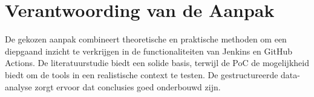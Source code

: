 \section{Verantwoording van de Aanpak}
De gekozen aanpak combineert theoretische en praktische methoden om een diepgaand inzicht te verkrijgen in de functionaliteiten van Jenkins en GitHub Actions. De literatuurstudie biedt een solide basis, terwijl de PoC de mogelijkheid biedt om de tools in een realistische context te testen. De gestructureerde data-analyse zorgt ervoor dat conclusies goed onderbouwd zijn.






